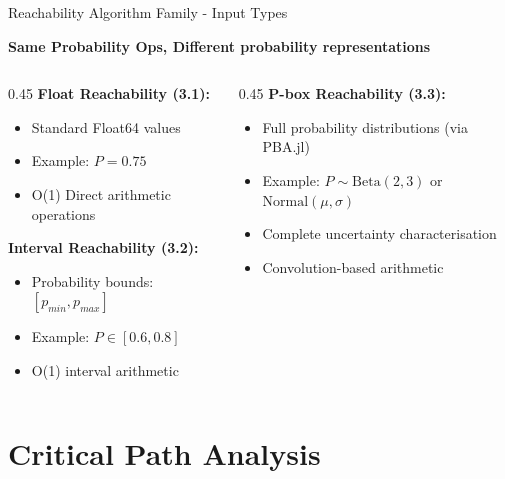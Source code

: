 \documentclass[aspectratio=169]{beamer}
\begin{document}
\begin{frame}{\textcolor{juliapurple}{ Reachability Algorithm Family - Input Types}}
\begin{center}
\textbf{\textcolor{juliapurple}{Same Probability Ops, Different probability representations}}


\end{center}
\begin{columns}
\begin{column}{0.45\textwidth}
\textbf{\textcolor{juliagreen}{Float Reachability (3.1):}}
\begin{itemize}
    \item Standard Float64 values
    \item Example: $P = 0.75$
    \item O(1) Direct arithmetic operations
\end{itemize}

\vspace{0.4cm}
\textbf{\textcolor{juliablue}{Interval Reachability (3.2):}}
\begin{itemize}
    \item Probability bounds: $[p_{min}, p_{max}]$
    \item Example: $P \in [0.6, 0.8]$
    \item O(1) interval arithmetic
\end{itemize}
\end{column}

\begin{column}{0.45\textwidth}
\textbf{\textcolor{juliared}{P-box Reachability (3.3):}}
\begin{itemize}
    \item Full probability distributions (via PBA.jl)
    \item Example: $P \sim \text{Beta}(2,3)$ or $\text{Normal}(\mu, \sigma)$
    \item Complete uncertainty characterisation
    \item Convolution-based arithmetic
\end{itemize}


\end{column}
\end{columns}
\end{frame}





\section{Critical Path Analysis}
\end{document}
